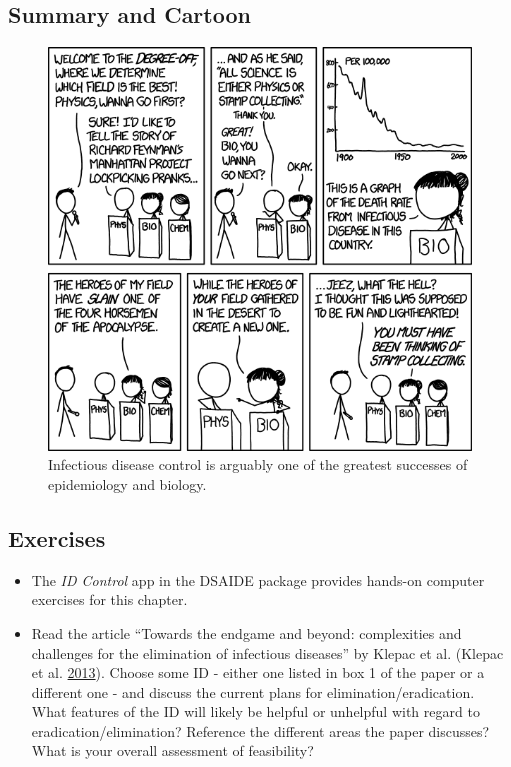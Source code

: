 \documentclass[]{article}
\providecommand{\tightlist}{%
  \setlength{\itemsep}{0pt}\setlength{\parskip}{0pt}}
\theoremstyle{definition}
\theoremstyle{definition}
\theoremstyle{definition}
\theoremstyle{remark}
\begin{document}
\subsection{Summary and Cartoon}\label{summary-and-cartoon-8}

\begin{figure}
\centering
\includegraphics{./images/xkcd-disease-eradication.png}
\caption{Infectious disease control is arguably one of the greatest
successes of epidemiology and biology.}
\end{figure}

\subsection{Exercises}\label{exercises-8}

\begin{itemize}
\tightlist
\item
  The \emph{ID Control} app in the DSAIDE package provides hands-on
  computer exercises for this chapter.
\item
  Read the article ``Towards the endgame and beyond: complexities and
  challenges for the elimination of infectious diseases'' by Klepac et
  al. (Klepac et al. \protect\hyperlink{ref-klepac13}{2013}). Choose
  some ID - either one listed in box 1 of the paper or a different one -
  and discuss the current plans for elimination/eradication. What
  features of the ID will likely be helpful or unhelpful with regard to
  eradication/elimination? Reference the different areas the paper
  discusses? What is your overall assessment of feasibility?
\end{itemize}
\end{document}
